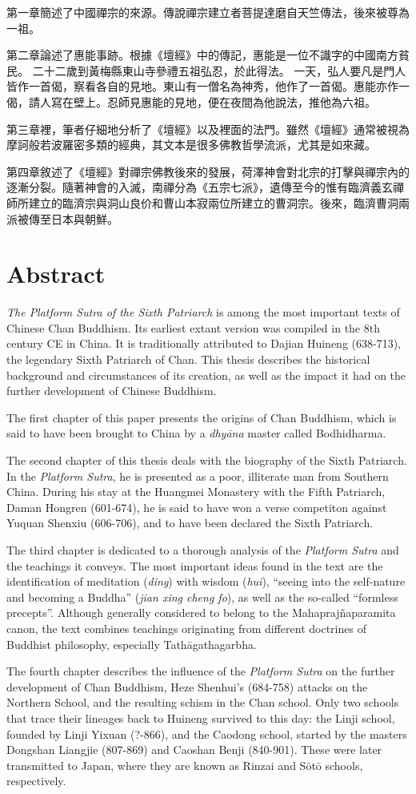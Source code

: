 第一章簡述了中國禪宗的來源。傳說禪宗建立者菩提達磨自天竺傳法，後來被尊為一祖。

第二章論述了惠能事跡。根據《壇經》中的傳記，惠能是一位不識字的中國南方貧民。
二十二歲到黃梅縣東山寺參禮五祖弘忍，於此得法。
一天，弘人要凡是門人皆作一首偈，察看各自的見地。東山有一僧名為神秀，他作了一首偈。惠能亦作一偈，請人寫在壁上。忍師見惠能的見地，便在夜間為他說法，推他為六祖。

第三章裡，筆者仔細地分析了《壇經》以及裡面的法門。雖然《壇經》通常被視為摩訶般若波羅密多類的經典，其文本是很多佛教哲學流派，尤其是如來藏。

第四章敘述了《壇經》對禪宗佛教後來的發展，荷澤神會對北宗的打擊與禪宗內的逐漸分裂。隨著神會的入滅，南禪分為《五宗七派》，遺傳至今的惟有臨濟義玄禪師所建立的臨濟宗與洞山良价和曹山本寂兩位所建立的曹洞宗。後來，臨濟曹洞兩派被傳至日本與朝鮮。

\chapter*{Abstract}
\textit{The Platform Sutra of the Sixth Patriarch} is among the most important texts of Chinese Chan Buddhism.
Its earliest extant version was compiled in the 8th century CE in China.
It is traditionally attributed to Dajian Huineng (638-713), the legendary Sixth Patriarch of Chan.
This thesis describes the historical background and circumstances of its creation, as well as the impact it had on the further development of Chinese Buddhism.

The first chapter of this paper presents the origins of Chan Buddhism, which is said to have been brought to China by a \textit{dhyāna} master called Bodhidharma.

The second chapter of this thesis deals with the biography of the Sixth Patriarch.
In the \textit{Platform Sutra}, he is presented as a poor, illiterate man from Southern China.
During his stay at the Huangmei Monastery with the Fifth Patriarch, Daman Hongren (601-674), he is said to have won a verse competiton against Yuquan Shenxiu (606-706), and to have been declared the Sixth Patriarch.

The third chapter is dedicated to a thorough analysis of the \textit{Platform Sutra} and the teachings it conveys.
The most important ideas found in the text are the identification of meditation (\textit{ding}) with wisdom (\textit{hui}), ``seeing into the self-nature and becoming a Buddha'' (\textit{jian xing cheng fo}), as well as the so-called ``formless precepts''.
Although generally considered to belong to the Mahaprajñaparamita canon, the text combines teachings originating from different doctrines of Buddhist philosophy, especially Tathāgathagarbha.

The fourth chapter describes the influence of the \textit{Platform Sutra} on the further development of Chan Buddhism, Heze Shenhui's (684-758) attacks on the Northern School, and the resulting schism in the Chan school.
Only two schools that trace their lineages back to Huineng survived to this day: the Linji school, founded by Linji Yixuan (?-866), and the Caodong school, started by the masters Dongshan Liangjie (807-869) and Caoshan Benji (840-901).
These were later transmitted to Japan, where they are known as Rinzai and Sōtō schools, respectively.
